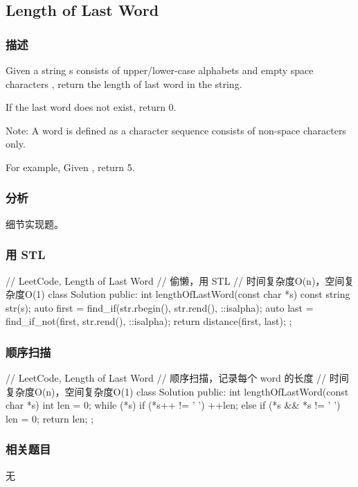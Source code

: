 \subsection{Length of Last Word} %
\label{sec:length-of-last-word}


\subsubsection{描述}
Given a string s consists of upper/lower-case alphabets and empty space characters , return the length of last word in the string.

If the last word does not exist, return 0.

Note: A word is defined as a character sequence consists of non-space characters only.

For example, 
Given ,
return 5.


\subsubsection{分析}
细节实现题。


\subsubsection{用 STL}
\begin{Code}
	// LeetCode, Length of Last Word
	// 偷懒，用 STL
	// 时间复杂度O(n)，空间复杂度O(1)
	class Solution {
		public:
		int lengthOfLastWord(const char *s) {
			const string str(s);
			auto first = find_if(str.rbegin(), str.rend(), ::isalpha);
			auto last = find_if_not(first, str.rend(), ::isalpha);
			return distance(first, last);
		}
	};
\end{Code}


\subsubsection{顺序扫描}
\begin{Code}
	// LeetCode, Length of Last Word
	// 顺序扫描，记录每个 word 的长度
	// 时间复杂度O(n)，空间复杂度O(1)
	class Solution {
		public:
		int lengthOfLastWord(const char *s) {
			int len = 0;
			while (*s) {
				if (*s++ != ' ')
				++len;
				else if (*s && *s != ' ')
				len = 0;
			}
			return len;
		}
	};
\end{Code}


\subsubsection{相关题目}
\begindot
\item 无
\myenddot
